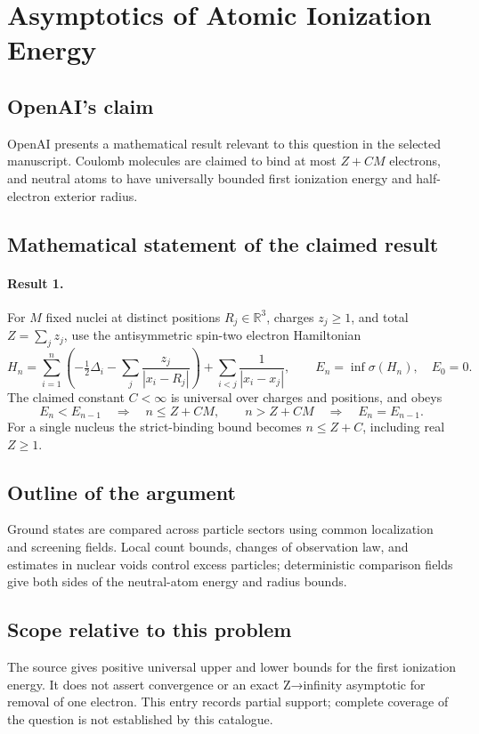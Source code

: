 \documentclass[11pt]{article}
\begin{document}
\section*{Asymptotics of Atomic Ionization Energy}

\subsection{OpenAI's claim}
OpenAI presents a mathematical result relevant to this question in the selected manuscript. Coulomb molecules are claimed to bind at most $Z+CM$ electrons, and neutral atoms to have universally bounded first ionization energy and half-electron exterior radius.

\subsection{Mathematical statement of the claimed result}
\paragraph{Result 1.} For \(M\) fixed nuclei at distinct positions \(R_j\in\mathbb R^3\), charges \(z_j\ge1\), and total \(Z=\sum_jz_j\), use the antisymmetric spin-two electron Hamiltonian
\[
 H_n=\sum_{i=1}^n\left(-\tfrac12\Delta_i-\sum_j\frac{z_j}{|x_i-R_j|}\right)
 +\sum_{i<j}\frac1{|x_i-x_j|},\qquad E_n=\inf\sigma(H_n),\quad E_0=0.
\]
The claimed constant \(C<\infty\) is universal over charges and positions, and obeys
\[
 E_n<E_{n-1}\quad\Longrightarrow\quad n\le Z+CM,
 \qquad n>Z+CM\quad\Longrightarrow\quad E_n=E_{n-1}.
\]
For a single nucleus the strict-binding bound becomes \(n\le Z+C\), including real \(Z\ge1\).

\subsection{Outline of the argument}
Ground states are compared across particle sectors using common localization and screening fields. Local count bounds, changes of observation law, and estimates in nuclear voids control excess particles; deterministic comparison fields give both sides of the neutral-atom energy and radius bounds.

\subsection{Scope relative to this problem}
The source gives positive universal upper and lower bounds for the first ionization energy. It does not assert convergence or an exact Z→infinity asymptotic for removal of one electron. This entry records partial support; complete coverage of the question is not established by this catalogue.
\end{document}
